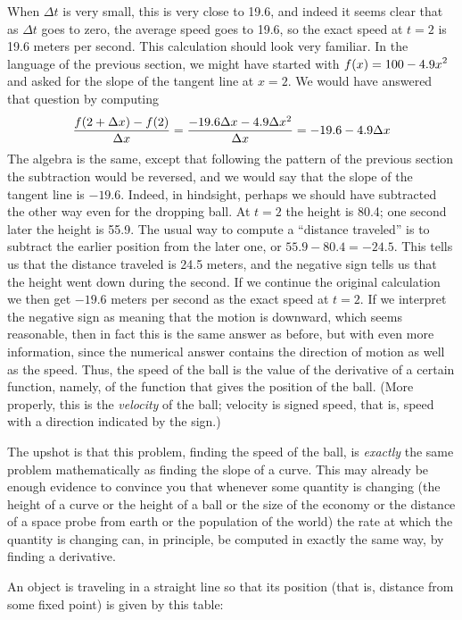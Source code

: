 When $\Delta t$ is very small, this is very close to 19.6, and indeed
it seems clear that as $\Delta t$ goes to zero, the average speed goes
to 19.6, so the exact speed at $t=2$ is 19.6 meters per second. This
calculation should look very familiar. In the language of the previous
section, we might have started with $\displaystyle f(x)=100-4.9x^2$ and asked for
the slope of the tangent line at $x=2$. We would have answered that
question by computing
$$
{f(2+\Delta x) - f(2)\over \Delta x}
={-19.6\Delta x-4.9\Delta x^2\over \Delta x}
=-19.6-4.9\Delta x
$$ The algebra is the same, except that following the pattern of the
previous section the subtraction would be reversed, and we would say
that the slope of the tangent line is $-19.6$. Indeed, in hindsight,
perhaps we should have subtracted the other way even for the dropping
ball. At $t=2$ the height is 80.4; one second later the height is
55.9. The usual way to compute a ``distance traveled'' is to subtract
the earlier position from the later one, or $55.9-80.4=-24.5$. This
tells us that the distance traveled is 24.5 meters, and the negative
sign tells us that the height went down during the second. If we
continue the original calculation we then get $-19.6$ meters per
second as the exact speed at $t=2$. If we interpret the negative sign
as meaning that the motion is downward, which seems reasonable, then
in fact this is the same answer as before, but with even more
information, since the numerical answer contains the direction of
motion as well as the speed. Thus, the speed of the ball is the value
of the derivative of a certain function, namely, of the function that
gives the position of the ball. (More properly, this is the {\em
  velocity\/} of the ball; velocity is signed speed,
that is, speed with a direction indicated by the sign.)

The upshot is that this problem, finding the speed of the ball, is
{\it exactly\/} the same problem mathematically as finding the slope
of a curve. This may already be enough evidence to convince you that
whenever some quantity is changing (the height of a curve or the
height of a ball or the size of the economy or the distance of a space
probe from earth or the population of the world) the rate at which the
quantity is changing can, in principle, be computed in exactly the
same way, by finding a derivative.

\exercises

\exercise
An object is traveling in a straight line so that its position (that
is, distance from some fixed point) is
given by this table:

